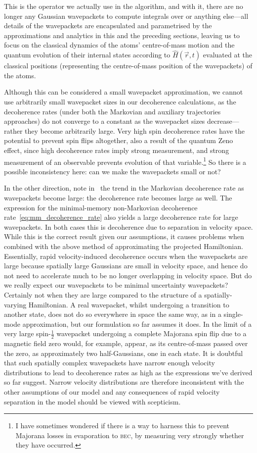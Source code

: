 This is the operator we actually use in the algorithm, and with it, there are no longer any Gaussian wavepackets to compute integrals over or anything else---all details of the wavepackets are encapsulated and parametrised by the approximations and analytics in this and the preceding sections, leaving us to focus on the classical dynamics of the atoms' centre-of-mass motion and the quantum evolution of their internal states according to $\hat H(\vec r, t)$ evaluated at the classical positions (representing the centre-of-mass position of the wavepackets) of the atoms.

Although this can be considered a small wavepacket approximation, we cannot use arbitrarily small wavepacket sizes in our decoherence calculations, as the decoherence rates (under both the Markovian and auxiliary trajectories approaches) do not converge to a constant as the wavepacket sizes decrease---rather they become arbitrarily large. Very high spin decoherence rates have the potential to prevent spin flips altogether, also a result of the quantum Zeno effect, since high decoherence rates imply strong measurement, and strong measurement of an observable prevents evolution of that variable.\footnote{I have sometimes wondered if there is a way to harness this to prevent Majorana losses in evaporation to \textsc{bec}, by measuring very strongly whether they have occurred.} So there is a possible inconsistency here: can we make the wavepackets small or not?

In the other direction, note in~ the trend in the Markovian decoherence rate as wavepackets become large: the decoherence rate becomes large as well. The expression for the minimal-memory non-Markovian decoherence rate~\eqref{eq:mm_decoherence_rate} also yields a large decoherence rate for large wavepackets. In both cases this is decoherence due to separation in velocity space. While this is the correct result given our assumptions, it causes problems when combined with the above method of approximating the projected Hamiltonian. Essentially, rapid velocity-induced decoherence occurs when the wavepackets are large because spatially large Gaussians are small in velocity space, and hence do not need to accelerate much to be no longer overlapping in velocity space. But do we really expect our wavepackets to be minimal uncertainty wavepackets? Certainly not when they are large compared to the structure of a spatially-varying Hamiltonian. A real wavepacket, whilst undergoing a transition to another state, does not do so everywhere in space the same way, as in a single-mode approximation, but our formulation so far assumes it does. In the limit of a very large spin-$\frac12$ wavepacket undergoing a complete Majorana spin flip due to a magnetic field zero would, for example, appear, as its centre-of-mass passed over the zero, as approximately two half-Gaussians, one in each state. It is doubtful that such spatially complex wavepackets have narrow enough velocity distributions to lead to decoherence rates as high as the expressions we've derived so far suggest. Narrow velocity distributions are therefore inconsistent with the other assumptions of our model and any consequences of rapid velocity separation in the model should be viewed with scepticism.

